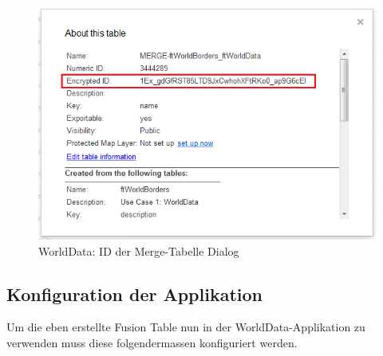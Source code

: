 \begin{figure}[H]
	\centering
	\includegraphics[scale=0.8]{images/usecase1-worlddata/documentation/worlddata-prepare_fusiontableslayer4.png}
	\caption{WorldData: ID der Merge-Tabelle Dialog}
	\label{worlddata-prepare_fusiontableslayer4}
\end{figure}

\subsection{Konfiguration der Applikation}
Um die eben erstellte Fusion Table nun in der WorldData-Applikation zu verwenden muss diese folgendermassen konfiguriert werden.

